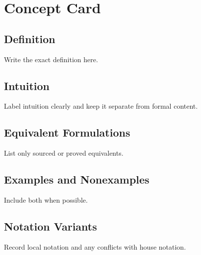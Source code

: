 

\section*{Concept Card}

\subsection*{Definition}

Write the exact definition here.

\subsection*{Intuition}

Label intuition clearly and keep it separate from formal content.

\subsection*{Equivalent Formulations}

List only sourced or proved equivalents.

\subsection*{Examples and Nonexamples}

Include both when possible.

\subsection*{Notation Variants}

Record local notation and any conflicts with house notation.